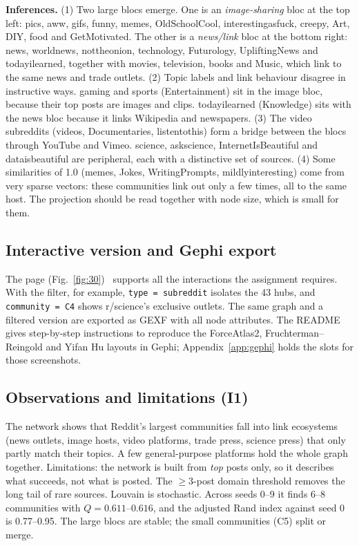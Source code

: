 \textbf{Inferences.}
(1) Two large blocs emerge. One is an \emph{image-sharing} bloc at the top left: pics, aww, gifs, funny, memes,
OldSchoolCool, interestingasfuck, creepy, Art, DIY, food and GetMotivated. The other is a \emph{news/link} bloc at the
bottom right: news, worldnews, nottheonion, technology, Futurology, UpliftingNews and todayilearned, together with
movies, television, books and Music, which link to the same news and trade outlets.
(2) Topic labels and link behaviour disagree in instructive ways. gaming and sports (Entertainment) sit in the image bloc,
because their top posts are images and clips. todayilearned (Knowledge) sits with the news bloc because it links
Wikipedia and newspapers.
(3) The video subreddits (videos, Documentaries, listentothis) form a bridge between the blocs through YouTube and Vimeo.
science, askscience, InternetIsBeautiful and dataisbeautiful are peripheral, each with a distinctive set of sources.
(4) Some similarities of 1.0 (memes, Jokes, WritingPrompts, mildlyinteresting) come from very sparse vectors: these
communities link out only a few times, all to the same host. The projection should be read together with node size,
which is small for them.

\subsection{Interactive version and Gephi export}
The page (Fig.~\ref{fig:30})~\cite{pyvis} supports all the interactions the assignment requires. With the filter, for
example, \texttt{type = subreddit} isolates the 43 hubs, and \texttt{community = C4} shows r/science's exclusive outlets.
The same graph and a filtered version are exported as GEXF with all node attributes. The README gives step-by-step
instructions to reproduce the ForceAtlas2, Fruchterman--Reingold and Yifan Hu layouts in Gephi; Appendix~\ref{app:gephi}
holds the slots for those screenshots.

\subsection{Observations and limitations (I1)}
The network shows that Reddit's largest communities fall into link ecosystems (news outlets, image hosts, video
platforms, trade press, science press) that only partly match their topics. A few general-purpose platforms hold the whole
graph together. Limitations: the network is built from \emph{top} posts only, so it describes what succeeds, not what is
posted. The $\ge3$-post domain threshold removes the long tail of rare sources. Louvain is stochastic. Across seeds 0--9 it finds 6--8 communities with $Q=0.611$--$0.616$, and the adjusted
Rand index against seed 0 is 0.77--0.95. The large blocs are stable; the small communities (C5) split or merge.
